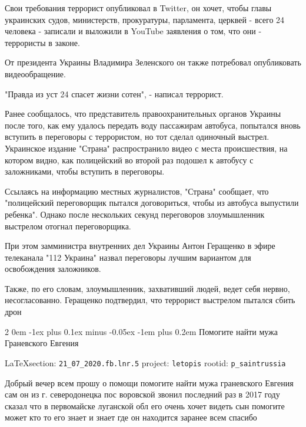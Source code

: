 \documentclass[a4paper,11pt]{extreport}
\makeatletter
\renewcommand\subsection{%
  \clearpage
    \@startsection{subsection}%
    {2}%
    {0em}%
    {-1ex plus 0.1ex minus -0.05ex}%
    {-1em plus 0.2em}%
    {\scshape\bfseries\Large}%
}
\makeatother
\begin{document}
Свои требования террорист опубликовал в Twitter, он хочет, чтобы главы
украинских судов, министерств, прокуратуры, парламента, церквей - всего 24
человека - записали и выложили в YouTube заявления о том, что они - террористы
в законе.

От президента Украины Владимира Зеленского он также потребовал опубликовать
видеообращение.

"Правда из уст 24 спасет жизни сотен", - написал террорист.

Ранее сообщалось, что представитель правоохранительных органов Украины после
того, как ему удалось передать воду пассажирам автобуса, попытался вновь
вступить в переговоры с террористом, но тот сделал одиночный выстрел.
Украинское издание "Страна" распространило видео с места происшествия, на
котором видно, как полицейский во второй раз подошел к автобусу с заложниками,
чтобы вступить в переговоры.

Ссылаясь на информацию местных журналистов, "Страна" сообщает, что "полицейский
переговорщик пытался договориться, чтобы из автобуса выпустили ребенка". Однако
после нескольких секунд переговоров злоумышленник выстрелом отогнал
переговорщика.

При этом замминистра внутренних дел Украины Антон Геращенко в эфире телеканала
"112 Украина" назвал переговоры лучшим вариантом для освобождения заложников.

Также, по его словам, злоумышленник, захвативший людей, ведет себя нервно,
несогласованно.  Геращенко подтвердил, что террорист выстрелом пытался сбить
дрон
 
 
\subsection{Помогите найти мужа Граневского Евгения}
\label{sec:21_07_2020.fb.lnr.5}
  
\vspace{0.5cm}
{\small\LaTeX section: \verb|21_07_2020.fb.lnr.5| project: \verb|letopis| rootid: \verb|p_saintrussia|}
\vspace{0.5cm}
 
Добрый вечер всем прошу о помощи помогите найти мужа граневского Евгения сам он
из г. северодонецка пос воровской звонил последний раз в 2017 году сказал что в
первомайске луганской обл его очень хочет видеть сын помогите может кто то его
знает и знает где он находится заранее всем спасибо
\end{document}
